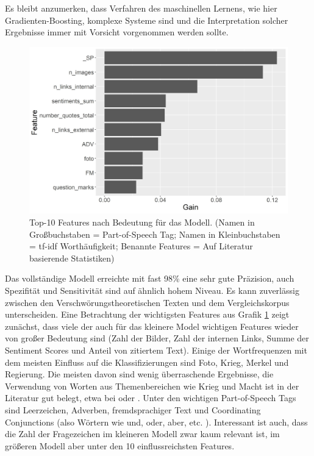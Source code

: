 Es bleibt anzumerken, dass Verfahren des maschinellen Lernens, wie hier Gradienten-Boosting, komplexe Systeme sind und die Interpretation solcher Ergebnisse immer mit Vorsicht vorgenommen werden sollte.

\begin{figure}[h]
    \centering
    \includegraphics[scale=0.45]{graphics/top_10_features.jpg}
    \caption{Top-10 Features nach Bedeutung für das Modell. (Namen in Großbuchstaben = Part-of-Speech Tag; Namen in Kleinbuchstaben = tf-idf Worthäufigkeit; Benannte Features = Auf Literatur basierende Statistiken)}
    \label{top-features}
\end{figure}

\FloatBarrier

Das vollständige Modell erreichte mit fast 98\% eine sehr gute Präzision, auch Spezifität und Sensitivität sind auf ähnlich hohem Niveau.
Es kann zuverlässig zwischen den Verschwörungstheoretischen Texten und dem Vergleichskorpus unterscheiden.
Eine Betrachtung der wichtigsten Features aus Grafik \ref{top-features} zeigt zunächst, dass viele der auch für das kleinere Model wichtigen Features wieder von großer Bedeutung sind (Zahl der Bilder, Zahl der internen Links, Summe der Sentiment Scores und Anteil von zitiertem Text).
Einige der Wortfrequenzen mit dem meisten Einfluss auf die Klassifizierungen sind Foto, Krieg, Merkel und Regierung.
Die meisten davon sind wenig überraschende Ergebnisse, die Verwendung von Worten aus Themenbereichen wie Krieg und Macht ist in der Literatur gut belegt, etwa bei \textcite[150]{stumpf_2019} oder \textcite[25]{uscinski_2014}.
Unter den wichtigen Part-of-Speech Tags sind Leerzeichen, Adverben, fremdsprachiger Text und Coordinating Conjunctions (also Wörtern wie und, oder, aber, etc. \parencite[vgl.][]{smith_2003}).
Interessant ist auch, dass die Zahl der Fragezeichen im kleineren Modell zwar kaum relevant ist, im größeren Modell aber unter den 10 einflussreichsten Features.

